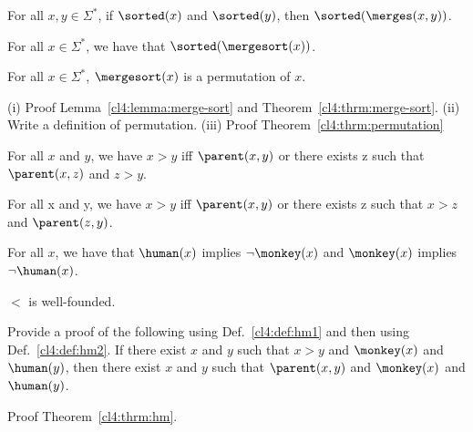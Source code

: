 \begin{lemma}
\label{cl4:lemma:merge-sort}
For all $x,y \in \Sigma^*$, if $\sorted(x)$ and $\sorted(y)$, then $\sorted(\merges(x,y))$.
\end{lemma}


\begin{theorem}
\label{cl4:thrm:merge-sort}
For all $x\in \Sigma^*$, we have that $\sorted(\mergesort(x))$.
\end{theorem}


\begin{theorem}[Permutation]
\label{cl4:thrm:permutation}
For all $x \in \Sigma^*$, $\mergesort(x)$ is a permutation of $x$.
\end{theorem}


\begin{exercise}
 (i) Proof Lemma~\ref{cl4:lemma:merge-sort} and Theorem~\ref{cl4:thrm:merge-sort}. (ii) Write a definition of permutation. 
 (iii) Proof Theorem~\ref{cl4:thrm:permutation}
\end{exercise}


\begin{definition}
\label{cl4:def:hm1}
For all $x$ and $y$, we have $x > y$ iff $\parent(x,y)$ or there exists z such that $\parent(x,z)$ and $z > y$.
\end{definition}
\begin{definition} 
\label{cl4:def:hm2}
For all x and y, we have $x > y$ iff $\parent(x,y)$ or there exists z such that $x > z$ and $\parent(z,y)$.
\end{definition}


\begin{axiom}For all $x$, we have that $\human(x)$ implies $\neg \monkey(x)$ and $\monkey(x)$ implies $\neg \human(x)$.
\end{axiom}

\begin{axiom} 
$<$ is well-founded.
\end{axiom}



\begin{theorem}
\label{cl4:thrm:hm}
Provide a proof of the following using Def.~\ref{cl4:def:hm1} and then using Def.~\ref{cl4:def:hm2}. If there exist $x$ and $y$ such that $x > y$ and $\monkey(x)$ and $\human(y)$, then there exist $x$ and $y$ such that $\parent(x,y)$ and $\monkey(x)$ and $\human(y)$.
\end{theorem}

\begin{exercise}
Proof Theorem~\ref{cl4:thrm:hm}.
\end{exercise}
